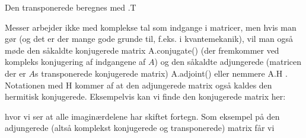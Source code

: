 \documentclass[letterpaper,10pt,english]{jupyterBook}
\begin{document}
\begin{sphinxVerbatim}[commandchars=\\\{\}]
  \PYG{p}{[}\PYG{p}{[} \PYG{p}{]} \PYG{p}{[} \PYG{p}{]}\PYG{p}{]}
\end{sphinxVerbatim}

\noindent{}

Den transponerede beregnes med .T

\begin{sphinxVerbatim}[commandchars=\\\{\}]
    
\end{sphinxVerbatim}

\noindent{}

Messer arbejder ikke med komplekse tal som indgange i matricer, men hvis man gør (og det er der mange gode grunde til, f.eks. i kvantemekanik), vil man også møde den såkaldte konjugerede matrix A.conjugate() (der fremkommer ved kompleks konjugering af indgangene af \(A\)) og den såkaldte adjungerede (matricen der er \(A\)s transponerede konjugerede matrix) A.adjoint() eller nemmere A.H . Notationen med H kommer af at den adjungerede matrix også kaldes den hermitisk konjugerede.
Eksempelvis kan vi finde den konjugerede matrix her:

\begin{sphinxVerbatim}[commandchars=\\\{\}]
  \PYG{p}{[}\PYG{p}{[} \PYG{p}{]} \PYG{p}{[} \PYG{p}{]}\PYG{p}{]}
\end{sphinxVerbatim}

\noindent{}

\noindent{}

hvor vi ser at alle imaginærdelene har skiftet fortegn.
Som eksempel på den adjungerede (altså komplekst konjugerede og transponerede) matrix får vi
\end{document}

